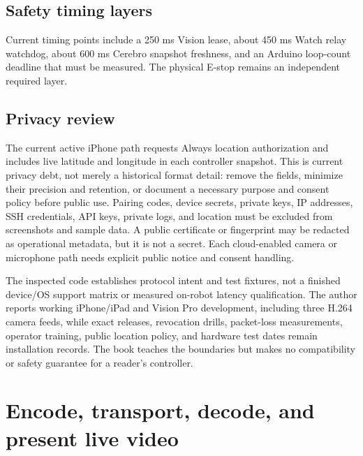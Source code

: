 \documentclass[10pt,openany]{book}
\begin{document}
\section{Safety timing layers}

\ROBStopChainDiagram

Current timing points include a 250 ms Vision lease, about 450 ms Watch relay watchdog, about 600 ms Cerebro snapshot freshness, and an Arduino loop-count deadline that must be measured. The physical E-stop remains an independent required layer.

\section{Privacy review}

The current active iPhone path requests Always location authorization and includes live latitude and longitude in each controller snapshot. This is current privacy debt, not merely a historical format detail: remove the fields, minimize their precision and retention, or document a necessary purpose and consent policy before public use. Pairing codes, device secrets, private keys, IP addresses, SSH credentials, API keys, private logs, and location must be excluded from screenshots and sample data. A public certificate or fingerprint may be redacted as operational metadata, but it is not a secret. Each cloud-enabled camera or microphone path needs explicit public notice and consent handling.

\begin{fieldnotebox}[title={CONTROLLER EVIDENCE LIMIT}]
The inspected code establishes protocol intent and test fixtures, not a finished device/OS support matrix or measured on-robot latency qualification. The author reports working iPhone/iPad and Vision Pro development, including three H.264 camera feeds, while exact releases, revocation drills, packet-loss measurements, operator training, public location policy, and hardware test dates remain installation records. The book teaches the boundaries but makes no compatibility or safety guarantee for a reader's controller.
\end{fieldnotebox}


\chapter{Encode, transport, decode, and present live video}
\end{document}

